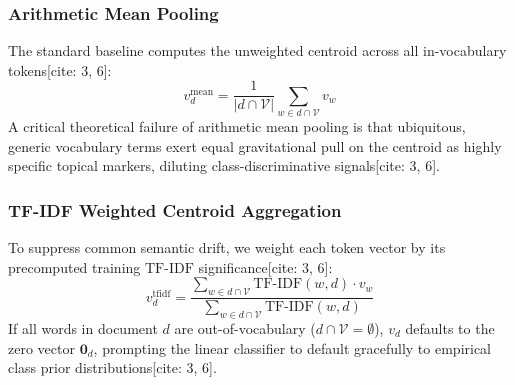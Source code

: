 \documentclass[11pt,a4paper]{article}
\begin{document}
	\subsubsection{Arithmetic Mean Pooling}
	The standard baseline computes the unweighted centroid across all in-vocabulary tokens[cite: 3, 6]:
	\begin{equation}
		v_d^{\text{mean}} = \frac{1}{|d \cap \mathcal{V}|} \sum_{w \in d \cap \mathcal{V}} v_w
		\label{eq:mean_pooling}
	\end{equation}
	A critical theoretical failure of arithmetic mean pooling is that ubiquitous, generic vocabulary terms exert equal gravitational pull on the centroid as highly specific topical markers, diluting class-discriminative signals[cite: 3, 6].
	
	\subsubsection{TF-IDF Weighted Centroid Aggregation}
	To suppress common semantic drift, we weight each token vector by its precomputed training $\text{TF-IDF}$ significance[cite: 3, 6]:
	\begin{equation}
		v_d^{\text{tfidf}} = \frac{\sum_{w \in d \cap \mathcal{V}} \text{TF-IDF}(w, d) \cdot v_w}{\sum_{w \in d \cap \mathcal{V}} \text{TF-IDF}(w, d)}
		\label{eq:tfidf_pooling}
	\end{equation}
	If all words in document $d$ are out-of-vocabulary ($d \cap \mathcal{V} = \emptyset$), $v_d$ defaults to the zero vector $\mathbf{0}_d$, prompting the linear classifier to default gracefully to empirical class prior distributions[cite: 3, 6].
	
\end{document}
